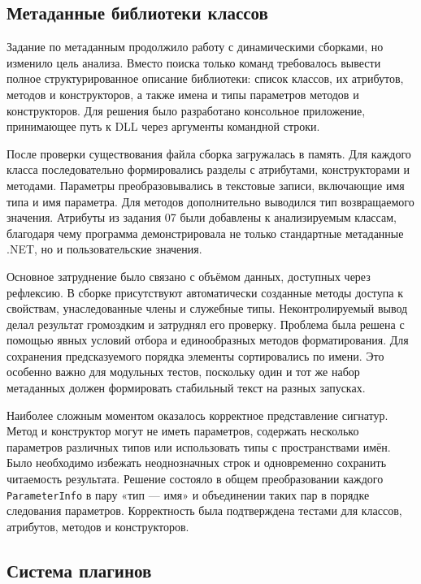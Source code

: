 \subsection{Метаданные библиотеки классов}

Задание по метаданным продолжило работу с динамическими сборками, но изменило цель анализа. Вместо поиска только команд требовалось вывести полное структурированное описание библиотеки: список классов, их атрибутов, методов и конструкторов, а также имена и типы параметров методов и конструкторов. Для решения было разработано консольное приложение, принимающее путь к DLL через аргументы командной строки.

После проверки существования файла сборка загружалась в память. Для каждого класса последовательно формировались разделы с атрибутами, конструкторами и методами. Параметры преобразовывались в текстовые записи, включающие имя типа и имя параметра. Для методов дополнительно выводился тип возвращаемого значения. Атрибуты из задания 07 были добавлены к анализируемым классам, благодаря чему программа демонстрировала не только стандартные метаданные .NET, но и пользовательские значения.

Основное затруднение было связано с объёмом данных, доступных через рефлексию. В сборке присутствуют автоматически созданные методы доступа к свойствам, унаследованные члены и служебные типы. Неконтролируемый вывод делал результат громоздким и затруднял его проверку. Проблема была решена с помощью явных условий отбора и единообразных методов форматирования. Для сохранения предсказуемого порядка элементы сортировались по имени. Это особенно важно для модульных тестов, поскольку один и тот же набор метаданных должен формировать стабильный текст на разных запусках.

Наиболее сложным моментом оказалось корректное представление сигнатур. Метод и конструктор могут не иметь параметров, содержать несколько параметров различных типов или использовать типы с пространствами имён. Было необходимо избежать неоднозначных строк и одновременно сохранить читаемость результата. Решение состояло в общем преобразовании каждого \texttt{ParameterInfo} в пару «тип --- имя» и объединении таких пар в порядке следования параметров. Корректность была подтверждена тестами для классов, атрибутов, методов и конструкторов.

\subsection{Система плагинов}


